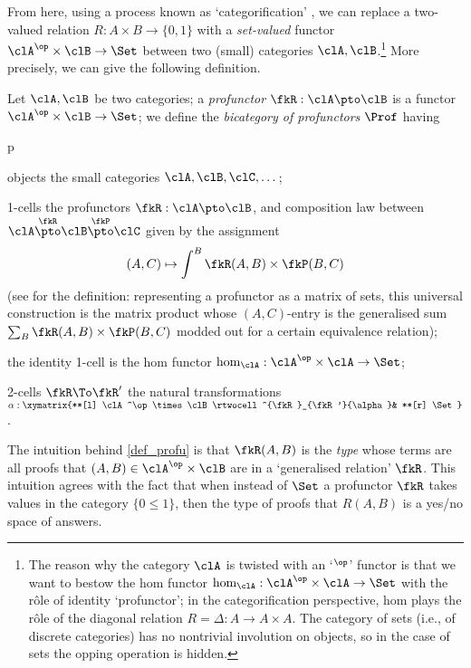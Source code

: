 From here, using a process known as `categorification' \cite{baez1998categorification}, we can replace a two-valued relation $R : A\times B \to \{0,1\}$ with a \emph{set-valued} functor $\clA^\op\times\clB \to \Set$ between two (small) categories $\clA,\clB$.\footnote{The reason why the category $\clA$ is twisted with an `$^\op$' functor is that we want to bestow the hom functor $\hom_{\clA} : \clA^\op\times\clA \to \Set$ with the r\^ole of identity `profunctor'; in the categorification perspective, hom plays the r\^ole of the diagonal relation $R=\Delta : A\to A\times A$. The category of sets (i.e., of discrete categories) has no nontrivial involution on objects, so in the case of sets the opping operation is hidden.} More precisely, we can give the following definition.
\begin{definition}[Profunctor]\label{def_profu}
	Let $\clA,\clB$ be two categories; a \emph{profunctor} $\fkR : \clA \pto \clB$ is a functor $\clA^\op\times\clB \to \Set$; we define the \emph{bicategory of profunctors} $\Prof$ having
	\begin{enumtag}{p}
		\item objects the small categories $\clA,\clB,\clC,\dots$;
		\item 1-cells the profunctors $\fkR : \clA \pto \clB$, and composition law between $\clA \overset{\fkR}{\pto} \clB \overset{\fkP}{\pto} \clC$ given by the assignment
		\[ (A,C)\mapsto \int^B \fkR(A,B)\times\fkP(B,C) \]
		(see \cite[6.2.10]{Bor2} for the definition: representing a profunctor as a matrix of sets, this universal construction is the matrix product whose $(A,C)$-entry is the generalised sum $\sum_B \fkR(A,B)\times\fkP(B,C)$ modded out for a certain equivalence relation); 
		\item the identity 1-cell is the hom functor $\hom_\clA : \clA^\op\times\clA \to \Set$;
		\item 2-cells $\fkR\To\fkR'$ the natural transformations $\alpha : \xymatrix{**[l] \clA^\op\times\clB \rtwocell^{\fkR}_{\fkR'}{\alpha}& **[r] \Set}$.
	\end{enumtag}
\end{definition}
The intuition behind \autoref{def_profu} is that $\fkR(A,B)$ is the \emph{type} whose terms are all proofs that $(A,B)\in\clA^\op\times\clB$ are in a  `generalised relation' $\fkR$. This intuition agrees with the fact that when instead of $\Set$ a profunctor $\fkR$ takes values in the category $\{0\le 1\}$, then the type of proofs that $R(A,B)$ is a yes/no space of answers.

